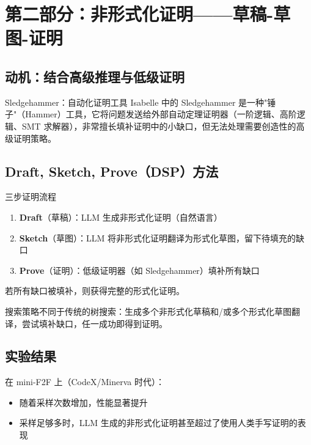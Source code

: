 \section{第二部分：非形式化证明——草稿-草图-证明}

\subsection{动机：结合高级推理与低级证明}

\begin{knowledgebox}{Sledgehammer：自动化证明工具}
Isabelle 中的 Sledgehammer 是一种"锤子"（Hammer）工具，它将问题发送给外部自动定理证明器（一阶逻辑、高阶逻辑、SMT 求解器），非常擅长填补证明中的小缺口，但无法处理需要创造性的高级证明策略。
\end{knowledgebox}

\subsection{Draft, Sketch, Prove（DSP）方法}

\begin{importantbox}{三步证明流程}
\begin{enumerate}
    \item \textbf{Draft}（草稿）：LLM 生成非形式化证明（自然语言）
    \item \textbf{Sketch}（草图）：LLM 将非形式化证明翻译为形式化草图，留下待填充的缺口
    \item \textbf{Prove}（证明）：低级证明器（如 Sledgehammer）填补所有缺口
\end{enumerate}
若所有缺口被填补，则获得完整的形式化证明。
\end{importantbox}

搜索策略不同于传统的树搜索：生成多个非形式化草稿和/或多个形式化草图翻译，尝试填补缺口，任一成功即得到证明。

\subsection{实验结果}

在 mini-F2F 上（CodeX/Minerva 时代）：
\begin{itemize}
    \item 随着采样次数增加，性能显著提升
    \item 采样足够多时，LLM 生成的非形式化证明甚至超过了使用人类手写证明的表现
\end{itemize}

